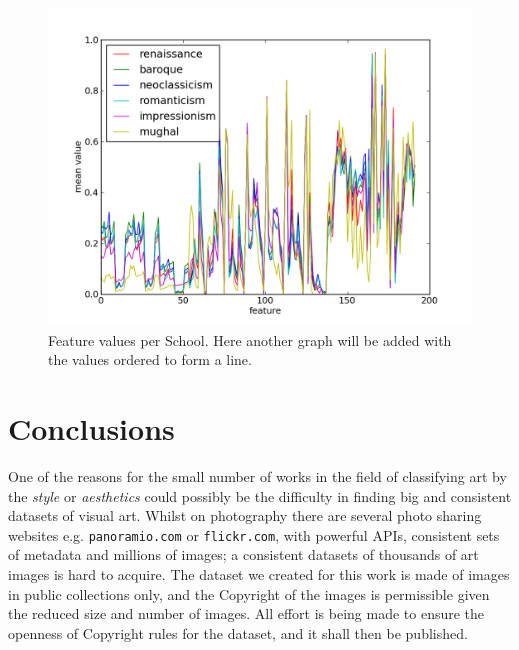 \documentclass[11pt,a4paper,twoside,openright]{report}
\begin{document}
\begin{figure}[tbp]
\centering
\includegraphics[width=\textwidth]{school-graph}
\caption[Feature Values]{Feature values per School. Here another graph will be
added with the values ordered to form a line.}
\label{fig:school}
\end{figure}


%
%
%
%
%
%


\chapter{Conclusions}

One of the reasons for the small number of works in the field of classifying
art by the \emph{style} or \emph{aesthetics} could possibly be the difficulty
in finding big and consistent datasets of visual art.  Whilst on photography
there are several photo sharing websites e.g. \texttt{panoramio.com} or
\texttt{flickr.com}, with powerful APIs, consistent sets of metadata and
millions of images;  a consistent datasets of thousands of art images is hard
to acquire.  The dataset we created for this work is made of images in public
collections only, and the Copyright of the images is permissible given the
reduced size and number of images.  All effort is being made to ensure the
openness of Copyright rules for the dataset, and it shall then be published.
\end{document}
